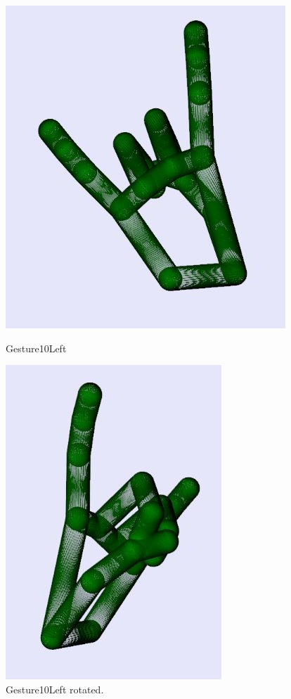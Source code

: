 \begin{figure}[H]
    \centering
    \begin{minipage}{0.5\textwidth}
        \centering
        \includegraphics[scale=.75]{Figures/gesture10Left.JPG} 
        \caption[Gesture10Left]{Gesture10Left}
		\label{fig:Gesture10Left}
    \end{minipage}\hfill
    \begin{minipage}{0.5\textwidth}
        \centering
        \includegraphics[scale=.75]{Figures/gesture10Left_rotated.JPG}
        \caption[Gesture10Left Rotated]{Gesture10Left rotated.}
        \label{fig:Gesture10Left_rotated}
    \end{minipage}
\end{figure}
